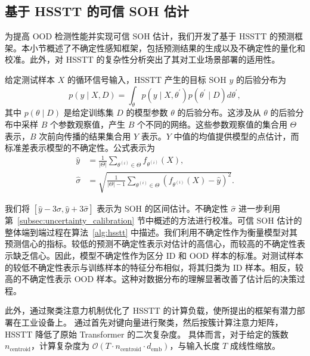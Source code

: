\documentclass[UTF8,journal,twoside,web]{ieeecolor}
\newcommand{\newtext}[1]{{\leavevmode\color{blue}#1}}
\begin{document}
\subsection{基于 HSSTT 的可信 SOH 估计}\label{subsec:trustworthy_soh_estimation}


为提高 OOD 检测性能并实现可信 SOH 估计，我们开发了基于 HSSTT 的预测框架。本小节概述了不确定性感知框架，包括预测结果的生成以及不确定性的量化和校准。此外，对 HSSTT 的复杂性分析突出了其对工业场景部署的适用性。

给定测试样本 $X$ 的循环信号输入，HSSTT 产生的目标 SOH $y$ 的后验分布为
\begin{equation}
p(y \mid X,D)=\int_{\theta}p(y \mid X,\theta^{\prime})p(\theta^{\prime} \mid D)d\theta^{\prime},
\label{eq:posterior_distribution}
\end{equation}%
其中 $p(\theta \mid D)$ 是给定训练集 $D$ 的模型参数 $\theta$ 的后验分布。这涉及从 $\theta$ 的后验分布中采样 $B$ 个参数观察值，产生 $B$ 个不同的网络。这些参数观察值的集合用 $\Theta$ 表示，$B$ 次前向传播的结果集合用 $Y$ 表示。$Y$ 中值的均值提供模型的点估计，而标准差表示模型的不确定性。公式表示为
\begin{align}
  \label{eq:predictive_mean} \hat{y} & =\frac{1}{|\Theta|}\sum_{\theta^{(i)} \in \Theta}f_{\theta^{(i)}}(X), \\
  \label{eq:predictive_std} \hat{\sigma} & =\sqrt{\frac{1}{|\Theta|-1}\sum_{\theta^{(i)}\in \Theta}(f_{\theta^{(i)}}(X)-\hat{y})^{2}}.
\end{align}

我们将 $[\hat{y}-3\hat{\sigma}, \hat{y}+3\hat{\sigma}]$ 表示为 SOH 的区间估计。不确定性 $\hat{\sigma}$ 进一步利用第~\ref{subsec:uncertainty_calibration} 节中概述的方法进行校准。可信 SOH 估计的整体端到端过程在算法~\ref{alg:hsstt} 中描述。我们利用不确定性作为衡量模型对其预测信心的指标。较低的预测不确定性表示对估计的高信心，而较高的不确定性表示缺乏信心。因此，模型不确定性作为区分 ID 和 OOD 样本的标准。对测试样本的较低不确定性表示与训练样本的特征分布相似，将其归类为 ID 样本。相反，较高的不确定性表示 OOD 样本。这种对数据分布的理解显著改善了估计后的决策过程。

\newtext{此外，通过聚类注意力机制优化了 HSSTT 的计算负载，使所提出的框架有潜力部署在工业设备上。}
通过首先对键向量进行聚类，然后按簇计算注意力矩阵，HSSTT 降低了原始 Transformer 的二次复杂度。
具体而言，对于给定的簇数 $ n_{\text{centroid}} $，计算复杂度为 $ \mathcal{O}(T \cdot n_{\text{centroid}} \cdot d_{\text{emb}}) $，与输入长度 $ T $ 成线性缩放。
\end{document}
